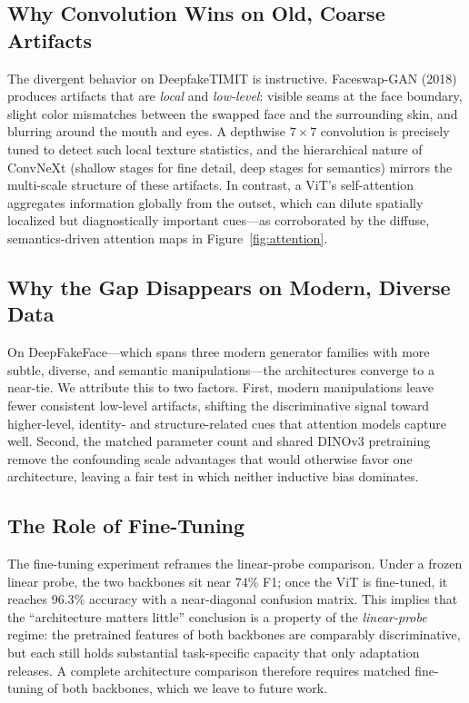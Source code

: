 \documentclass[11pt,a4paper]{article}
\begin{document}
\subsection{Why Convolution Wins on Old, Coarse Artifacts}
The divergent behavior on DeepfakeTIMIT is instructive. Faceswap-GAN (2018) produces artifacts
that are \emph{local} and \emph{low-level}: visible seams at the face boundary, slight color
mismatches between the swapped face and the surrounding skin, and blurring around the mouth and
eyes. A depthwise $7\times7$ convolution is precisely tuned to detect such local texture
statistics, and the hierarchical nature of ConvNeXt (shallow stages for fine detail, deep stages
for semantics) mirrors the multi-scale structure of these artifacts. In contrast, a ViT's
self-attention aggregates information globally from the outset, which can dilute spatially
localized but diagnostically important cues---as corroborated by the diffuse, semantics-driven
attention maps in Figure~\ref{fig:attention}.

\subsection{Why the Gap Disappears on Modern, Diverse Data}
On DeepFakeFace---which spans three modern generator families with more subtle, diverse, and
semantic manipulations---the architectures converge to a near-tie. We attribute this to two
factors. First, modern manipulations leave fewer consistent low-level artifacts, shifting the
discriminative signal toward higher-level, identity- and structure-related cues that attention
models capture well. Second, the matched parameter count and shared DINOv3 pretraining remove the
confounding scale advantages that would otherwise favor one architecture, leaving a fair test in
which neither inductive bias dominates.

\subsection{The Role of Fine-Tuning}
The fine-tuning experiment reframes the linear-probe comparison. Under a frozen linear probe, the
two backbones sit near $74\%$ F1; once the ViT is fine-tuned, it reaches $96.3\%$ accuracy with a
near-diagonal confusion matrix. This implies that the ``architecture matters little'' conclusion
is a property of the \emph{linear-probe} regime: the pretrained features of both backbones are
comparably discriminative, but each still holds substantial task-specific capacity that only
adaptation releases. A complete architecture comparison therefore requires matched fine-tuning of
both backbones, which we leave to future work.
\end{document}
